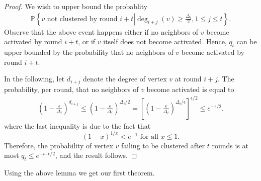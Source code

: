 \documentclass{article} %
\renewcommand{\Pr}{\mathbb{P}}
\begin{document}
\begin{proof}
We wish to upper bound the probablity
{\small 
\begin{align*}
\Pr\left\{\text{$v$ not clustered by round $i+t$}\left| \deg_{i+j}(v) \ge \frac{\Delta_i}{2}, 1\le j\le t \right.\right\}.
\end{align*}
}Observe that the above event happens either if no neighbors of $v$ become activated by round $i+t$, or if $v$ itself does not become activated.
Hence, $q_t$ can be upper bounded by the probability that no neighbors of $v$ become activated by round $i+t$.

In the following, let $d_{i+j}$ denote the degree of vertex $v$ at round $i+j$.
The probability, per round, that no neighbors of $v$ become activated is equal to
\begin{align*}
\left(1- \frac{\epsilon}{\Delta_i}\right)^{d_{i+j}}
\le \left(1- \frac{\epsilon}{\Delta_i}\right)^{\Delta_i/2}
= \left[\left(1- \frac{\epsilon}{\Delta_i}\right)^{\Delta_i/\epsilon}\right]^{\epsilon/2}
\le e^{-\epsilon/2}.
\end{align*}
where the last inequality is due to the fact that 
$$(1-x)^{1/x}<e^{-1}\text{ for all }x\le 1.$$
Therefore, the probability of vertex $v$ failing to be clustered after $t$ rounds is at most
$q_t\le e^{-t\cdot \epsilon /2}$,
and the result follows.
\end{proof}


Using the above lemma we get our first theorem.
\end{document}

